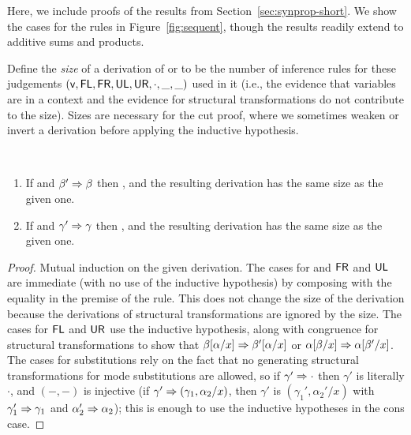 
\label{sec:synprop-long}

Here, we include proofs of the results from
Section~\ref{sec:synprop-short}.  We show the cases for the rules in
Figure~\ref{fig:sequent}, though the results readily extend to additive
sums and products.

Define the \emph{size} of a derivation of  or
\seq{\Gamma}{\gamma}{\Delta} to be the number of inference rules for
these judgements $(\mathsf{v},\mathsf{FL}, \mathsf{FR}, \mathsf{UL}, \mathsf{UR}, \cdot, \_,\_)$ used in it
(i.e., the evidence that variables are in a context and the evidence for
structural transformations do not contribute to the size).  Sizes are
necessary for the cut proof, where we sometimes weaken or invert a
derivation before applying the inductive hypothesis.

\begin{lemma} ~ %
\begin{enumerate}
\item If  and $\beta' \Rightarrow \beta$ then
  , and the resulting derivation has the same
  size as the given one.
\item If \seq{\Gamma}{\gamma}{\Delta} and $\gamma' \Rightarrow \gamma$ then
  , and the resulting derivation has the
  same size as the given one.
\end{enumerate}
\end{lemma}
\begin{proof}
Mutual induction on the given derivation.  The cases for  and
$\mathsf{FR}$ and $\mathsf{UL}$ are immediate (with no use of the inductive hypothesis)
by composing with the equality in the premise of the rule.  This does
not change the size of the derivation because the derivations of
structural transformations are ignored by the size.  The cases for $\mathsf{FL}$ and
$\mathsf{UR}$ use the inductive hypothesis, along with congruence for structural
transformations to show that $\beta[\alpha/x] \Rightarrow
\beta'[\alpha/x]$ or $\alpha[\beta/x] \Rightarrow
\alpha[\beta'/x]$.  The cases for substitutions rely on the
fact that no generating structural transformations for mode substitutions are
allowed, so if $\gamma' \Rightarrow \cdot$ then $\gamma'$ is literally $\cdot$,
and $(-,-)$ is injective (if $\gamma' \Rightarrow (\gamma_1,\alpha_2/x)$, then
$\gamma'$ is $(\gamma_1',\alpha_2'/x)$ with $\gamma_1' \Rightarrow \gamma_1$
and $\alpha_2' \Rightarrow \alpha_2$); this is enough to use the inductive
hypotheses in the cons case.
\end{proof}

